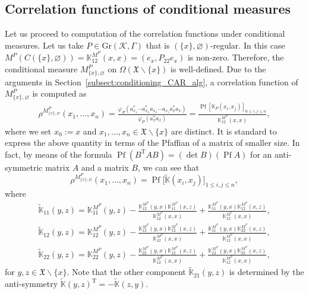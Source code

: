 \documentclass[pdftex]{sigma}
\numberwithin{equation}{section}
\newcommand{\pf}{\operatorname{Pf}}
\newcommand{\mfrak}[1]{\mathfrak{#1}}
\newcommand{\mcal}[1]{\mathcal{#1}}
\newcommand{\mbb}[1]{\mathbb{#1}}
\newcommand{\mrm}[1]{\mathrm{#1}}
\begin{document}
\subsection{Correlation functions of conditional measures}
Let us proceed to computation of the correlation functions under conditional measures.
Let us take $P\in \mrm{Gr}(\mcal{K},\Gamma)$ that is $(\{x\},\varnothing)$-regular. In this case $M^{P}(C(\{x\},\varnothing))=\mbb{K}^{M^{P}}_{12}(x,x)=(e_{x},P_{22}e_{x})$ is non-zero. Therefore, the conditional measure $M^{P}_{\{x\},\varnothing}$ on $\Omega (\mfrak{X}\backslash\{x\})$ is well-defined. Due to the arguments in Section~\ref{subsect:conditioning_CAR_alg}, a correlation function of $M^{P}_{\{x\},\varnothing}$ is computed as
\begin{gather*}
	\rho^{M^{P}_{\{x\},\varnothing}}(x_{1},\dots, x_{n}) =\frac{\varphi_{P}(a_{x_{1}}^{\ast}\cdots a_{x_{n}}^{\ast}a_{x_{n}}\cdots a_{x_{1}}a_{x}^{\ast}a_{x})}{\varphi_{P}(a_{x}^{\ast}a_{x})}
	 =\frac{\pf \left[\mbb{K}_{P}(x_{i},x_{j})\right]_{0\le i,j\le n}}{\mbb{K}^{M^{P}}_{12}(x,x)},
\end{gather*}
where we set $x_{0}:=x$ and $x_{1},\dots, x_{n}\in \mfrak{X}\backslash \{x\}$ are distinct.
It is standard to express the above quantity in terms of the Pfaffian of a matrix of smaller size.
In fact, by means of the formula $\pf (B^{\mrm{T}}AB)=(\det B)(\pf A)$ for an anti-symmetric matrix $A$ and a matrix $B$, we can see that
\begin{equation*}
	\rho^{M^{P}_{\{x\},\varnothing}}(x_{1},\dots, x_{n})=\pf \big[\widetilde{\mbb{K}}(x_{i},x_{j})\big]_{1\le i,j\le n},
\end{equation*}
where
\begin{gather*}
\widetilde{\mbb{K}}_{11}(y,z)=\mbb{K}^{M^{P}}_{11}(y,z)-\frac{\mbb{K}^{M^{P}}_{12}(y,x)\mbb{K}^{M^{P}}_{11}(x,z)}{\mbb{K}^{M^{P}}_{12}(x,x)}+\frac{\mbb{K}^{M^{P}}_{11}(y,x)\mbb{K}^{M^{P}}_{12}(x,z)}{\mbb{K}^{M^{P}}_{12}(x,x)}, \\
\widetilde{\mbb{K}}_{12}(y,z)=\mbb{K}^{M^{P}}_{12}(y,z)-\frac{\mbb{K}^{M^{P}}_{12}(y,x)\mbb{K}^{M^{P}}_{12}(x,z)}{\mbb{K}^{M^{P}}_{12}(x,x)}+\frac{\mbb{K}^{M^{P}}_{11}(y,x)\mbb{K}^{M^{P}}_{22}(x,z)}{\mbb{K}^{M^{P}}_{12}(x,x)}, \\
\widetilde{\mbb{K}}_{22}(y,z)=\mbb{K}^{M^{P}}_{22}(y,z)-\frac{\mbb{K}^{M^{P}}_{22}(y,x)\mbb{K}^{M^{P}}_{12}(x,z)}{\mbb{K}^{M^{P}}_{12}(x,x)}+\frac{\mbb{K}^{M^{P}}_{12}(y,x)\mbb{K}^{M^{P}}_{22}(x,z)}{\mbb{K}^{M^{P}}_{12}(x,x)},
\end{gather*}
for $y,z\in\mfrak{X}\backslash\{x\}$. Note that the other component $\widetilde{\mbb{K}}_{21}(y,z)$ is determined by the anti-symmetry $\widetilde{\mbb{K}}(y,z)^{\mrm{T}}=-\widetilde{\mbb{K}}(z,y)$.
\end{document}
